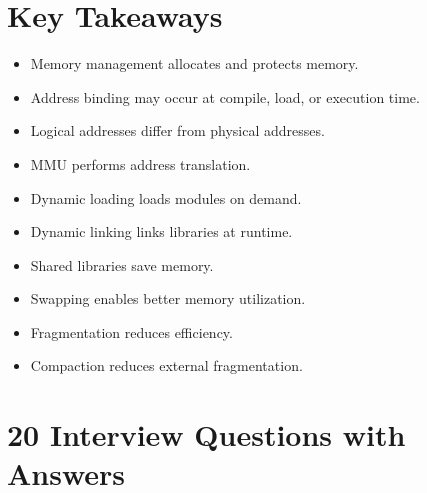 \section{Key Takeaways}

\begin{itemize}
\item Memory management allocates and protects memory.
\item Address binding may occur at compile, load, or execution time.
\item Logical addresses differ from physical addresses.
\item MMU performs address translation.
\item Dynamic loading loads modules on demand.
\item Dynamic linking links libraries at runtime.
\item Shared libraries save memory.
\item Swapping enables better memory utilization.
\item Fragmentation reduces efficiency.
\item Compaction reduces external fragmentation.
\end{itemize}

\section{20 Interview Questions with Answers}

